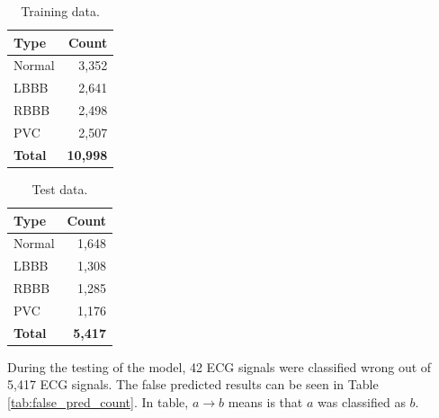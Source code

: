 \renewcommand{\arraystretch}{2}
\begin{table}
	\caption{Training data.} \label{tab:train_count}
	
	\begin{center}
		\begin{tabular}{ | l | r | }
			\hline
			\textbf{Type} & \textbf{Count} \\ \hline
			Normal & 3,352 \\ \hline
			LBBB  & 2,641  \\ \hline
			RBBB  & 2,498  \\ \hline
			PVC  & 2,507  \\ \hline
			\textbf{Total}  & \textbf{10,998}  \\ \hline
		\end{tabular}
	\end{center}
	
\end{table}


\renewcommand{\arraystretch}{2}
\begin{table}
	\caption{Test data.} \label{tab:test_count}
	
	\begin{center}
		\begin{tabular}{ | l | r | }
			\hline
			\textbf{Type} & \textbf{Count} \\ \hline
			Normal & 1,648 \\ \hline
			LBBB  & 1,308  \\ \hline
			RBBB  & 1,285  \\ \hline
			PVC  & 1,176  \\ \hline
			\textbf{Total}  & \textbf{5,417}  \\ \hline
		\end{tabular}
	\end{center}
	
\end{table}

During the testing of the model, 42 ECG signals were classified wrong out of 5,417 ECG signals. The false predicted results can be seen in Table \ref{tab:false_pred_count}. In table, $a \rightarrow b$ means is that $a$ was classified as $b$.






